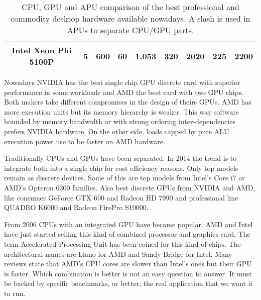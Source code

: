 \documentclass[review]{elsarticle}
\begin{document}
\begin{table*}[h]
{\begin{tabular}{|c|c|c|c|c|c|c|c|c|}
\hline
Intel Xeon Phi 5100P   & 5             & 600          & 60            & 1.053      & 320          & 2020            & 225 & 2200    \\
\hline
\end{tabular}
}
\caption{CPU, GPU and APU comparison of the best professional and
  commodity desktop hardware available nowadays. A slash is used in
  APUs to separate CPU/GPU parts. 
\label{tab:features}}
\end{table*}

Nowadays NVIDIA has the best single chip GPU discrete card with
superior performance in some workloads and AMD the best card with two
GPU chips. Both makers take different compromises in the design of
theirs GPUs. AMD has more execution units but its memory hierarchy is
weaker. This way software bounded by memory bandwidth or with strong
ordering inter-dependencies prefers NVIDIA hardware. On the other
side, loads capped by pure ALU execution power use to be faster on AMD
hardware. %

Traditionally CPUs and GPUs have been separated. In 2014 the trend is to integrate both into a single chip for cost efficiency reasons. Only top models remain as discrete devices. Some of this are top models from Intel's Core i7 or AMD's Opteron 6300 families. Also best discrete GPUs from NVIDIA and AMD, like consumer GeForce GTX 690 and Radeon HD 7990 and professional line QUADRO K6000 and Radeon FirePro S10000. 

From 2006 CPUs with an integrated GPU have became popular. AMD and Intel have just
started selling this kind of combined processor and graphics card. The
term Accelerated Processing Unit has been coined for this kind of
chips. The architectural names are Llano for AMD and Sandy Bridge for
Intel. Many reviews state that AMD's CPU cores are slower than Intel's
ones but their GPU is faster. Which combination is better is not an
easy question to answer. It must be backed by specific benchmarks, or
better, the real application that we want it to run. %
\end{document}
